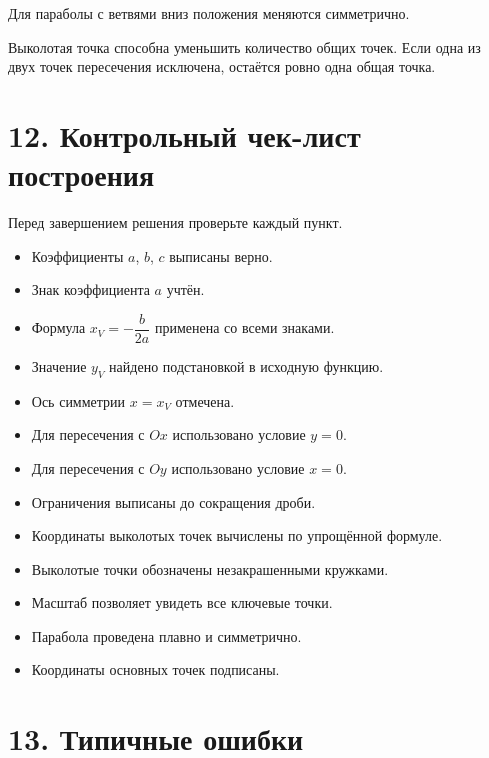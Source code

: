 \documentclass[a4paper,12pt]{article}
\newcommand{\checkitem}{\item[$\square$]}
\begin{document}
Для параболы с ветвями вниз положения меняются симметрично.

Выколотая точка способна уменьшить количество общих точек. Если одна из двух точек пересечения исключена, остаётся ровно одна общая точка.

\section*{12. Контрольный чек-лист построения}

Перед завершением решения проверьте каждый пункт.

\begin{itemize}
  \checkitem Коэффициенты \(a\), \(b\), \(c\) выписаны верно.
  \checkitem Знак коэффициента \(a\) учтён.
  \checkitem Формула \(x_V=-\dfrac{b}{2a}\) применена со всеми знаками.
  \checkitem Значение \(y_V\) найдено подстановкой в исходную функцию.
  \checkitem Ось симметрии \(x=x_V\) отмечена.
  \checkitem Для пересечения с \(Ox\) использовано условие \(y=0\).
  \checkitem Для пересечения с \(Oy\) использовано условие \(x=0\).
  \checkitem Ограничения выписаны до сокращения дроби.
  \checkitem Координаты выколотых точек вычислены по упрощённой формуле.
  \checkitem Выколотые точки обозначены незакрашенными кружками.
  \checkitem Масштаб позволяет увидеть все ключевые точки.
  \checkitem Парабола проведена плавно и симметрично.
  \checkitem Координаты основных точек подписаны.
\end{itemize}

\section*{13. Типичные ошибки}
\end{document}
